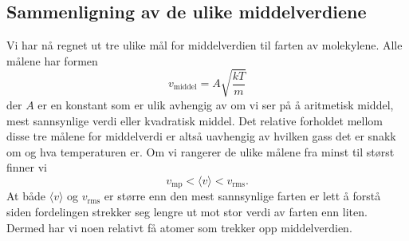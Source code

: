 \subsection{Sammenligning av de ulike middelverdiene}
Vi har nå regnet ut tre ulike mål for middelverdien til farten av molekylene. Alle målene har formen
\begin{displaymath}
	v_\text{middel} = A\sqrt{\frac{kT}{m}}
\end{displaymath}
der $A$ er en konstant som er ulik avhengig av om vi ser på å aritmetisk middel, mest sannsynlige verdi eller kvadratisk middel. Det relative forholdet mellom disse tre målene for middelverdi er altså uavhengig av hvilken gass det er snakk om  og hva temperaturen er. Om vi rangerer de ulike målene fra minst til størst finner vi
\begin{displaymath}
	v_\text{mp} < \langle v \rangle < v_\text{rms}.
\end{displaymath}
At både $\langle v \rangle$ og $v_\text{rms}$ er større enn den mest sannsynlige farten er lett å forstå siden fordelingen strekker seg lengre ut mot stor verdi av farten enn liten. Dermed har vi noen relativt få atomer som trekker opp middelverdien. 